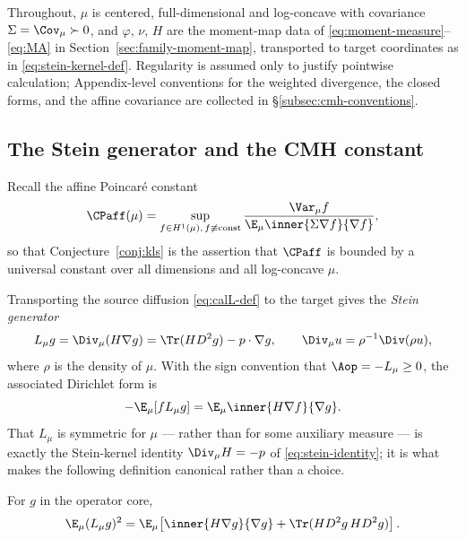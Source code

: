 \documentclass[../../main.tex]{subfiles}
\begin{document}
Throughout, $\mu$ is centered, full-dimensional and log-concave with covariance
$\Sigma=\Cov_\mu\succ0$, and $\varphi$, $\nu$, $H$ are the moment-map data of
\eqref{eq:moment-measure}--\eqref{eq:MA} in Section~\ref{sec:family-moment-map}, transported to
target coordinates as in \eqref{eq:stein-kernel-def}. Regularity is assumed only to justify
pointwise calculation; Appendix-level conventions for the weighted divergence, the closed forms,
and the affine covariance are collected in \S\ref{subsec:cmh-conventions}.

\subsection{The Stein generator and the CMH constant}
\label{subsec:cmh-definition}

Recall the affine Poincar\'e constant
\begin{equation}
  \CPaff(\mu)
  =\sup_{f\in H^1(\mu),\,f\not\equiv\mathrm{const}}
   \frac{\Var_\mu f}{\E_\mu\inner{\Sigma\nabla f}{\nabla f}},
  \label{eq:affine-poincare-constant}
\end{equation}
so that Conjecture~\ref{conj:kls} is the assertion that $\CPaff$ is bounded by a universal
constant over all dimensions and all log-concave $\mu$.

Transporting the source diffusion \eqref{eq:calL-def} to the target gives the \emph{Stein
generator}
\begin{equation}
  L_\mu g=\Div_\mu(H\nabla g)=\Tr(HD^2g)-p\cdot\nabla g,
  \qquad \Div_\mu u=\rho^{-1}\Div(\rho u),
  \label{eq:stein-generator}
\end{equation}
where $\rho$ is the density of $\mu$. With the sign convention that
$\Aop=-L_\mu\ge0$, the associated Dirichlet form is
\begin{equation}
  -\E_\mu[fL_\mu g]=\E_\mu\inner{H\nabla f}{\nabla g}.
  \label{eq:stein-dirichlet-form}
\end{equation}
That $L_\mu$ is symmetric for $\mu$ --- rather than for some auxiliary measure --- is exactly
the Stein-kernel identity $\Div_\mu H=-p$ of \eqref{eq:stein-identity}; it is what makes the
following definition canonical rather than a choice.

\begin{proposition}
\label{prop:cmh-bochner}
For $g$ in the operator core,
\begin{equation}
  \E_\mu(L_\mu g)^2
  =\E_\mu\!\left[\inner{H\nabla g}{\nabla g}+\Tr(HD^2g\,HD^2g)\right].
  \label{eq:cmh-bochner}
\end{equation}
\end{proposition}
\end{document}
